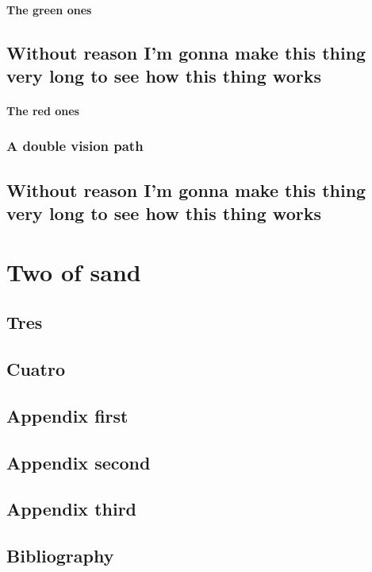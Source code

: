 \documentclass[draft]{qx-files/qx-book}
\begin{document}
\subsection{The green ones}

\lipsum[1]

\chapter*{Without reason I'm gonna make this thing very long to see how this thing works}

\subsection{The red ones}

\lipsum[1-2]

\section{A double vision path}

\lipsum

\chapter[Título largo]{Without reason I'm gonna make this thing very long to see how this thing works}
\lipsum


\part{Two of sand}

\chapter{Tres}
\lipsum


\chapter{Cuatro}
\lipsum[1]

\appendix

\chapter{Appendix first}


\lipsum[1]

\chapter{Appendix second}


\lipsum[1]

\chapter{Appendix third}


\lipsum[1]

\backmatter

\chapter{Bibliography}

\lipsum
\end{document}
